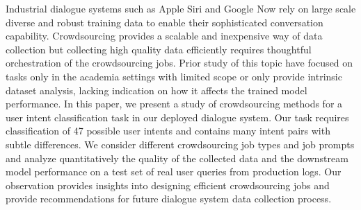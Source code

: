 Industrial dialogue systems such as Apple Siri and Google Now rely on large scale diverse and robust training data to enable their sophisticated conversation capability. Crowdsourcing provides a scalable and inexpensive way of data collection but collecting high quality data efficiently requires thoughtful orchestration of the crowdsourcing jobs. Prior study of this topic have focused on tasks only in the academia settings with limited scope or only provide intrinsic dataset analysis, lacking indication on how it affects the trained model performance. In this paper, we present a study of crowdsourcing methods for a user intent classification task in our deployed dialogue system. Our task requires classification of 47 possible user intents and contains many intent pairs with subtle differences. We consider different crowdsourcing job types and job prompts and analyze quantitatively the quality of the collected data and the downstream model performance on a test set of real user queries from production logs. Our observation provides insights into designing efficient crowdsourcing jobs and provide recommendations for future dialogue system data collection process.
